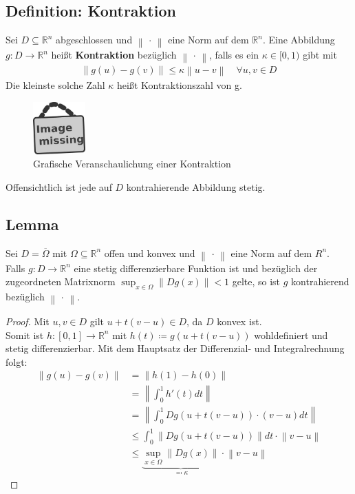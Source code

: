\documentclass[ngerman,fontsize=11pt, paper=a4, parskip=half, titlepage=true, toc=bib]{scrbook}
\newcommand{\R}{\mathds{R}}
\newcommand{\nn}[1]{\left\| #1 \right\|}
\newcommand{\imagemissing}[1]{
	\begin{figure}
		\parbox{\linewidth}{
			\centering
			\includegraphics[width=2cm]{images/image_missing.jpg}
		}
		\caption{#1}
	\end{figure}
}
\begin{document}
	\subsection{Definition: Kontraktion} 
	Sei $D\subseteq  \R^n $ abgeschlossen und $\nn{\,\cdot\,}$ eine Norm auf dem $\R^n$.
	Eine Abbildung $g:D\rightarrow \R^n $ heißt \textbf{Kontraktion} bezüglich  $\nn{\,\cdot\,}$,
	falls es ein $\kappa \in [0,1)$ gibt mit
	\begin{gather*}
		\nn{g(u)-g(v)} \leq \kappa \nn{u-v} \quad \forall u,v\in D
	\end{gather*}
	Die kleinste solche Zahl $\kappa$ heißt Kontraktionszahl von g.
	
	\imagemissing{Grafische Veranschaulichung einer Kontraktion}
	
	Offensichtlich ist jede auf $D$ kontrahierende Abbildung stetig.
	
	\subsection{Lemma} \label{5.2.3}\addtocounter{equation}{1}
	Sei $D=\overline{\Omega} $ mit $\Omega \subseteq \R^n$ offen und konvex
	und $\nn{\,\cdot\,}$ eine Norm auf dem $R^n$.\\
	Falls $g:D\longrightarrow \R^n$ eine stetig differenzierbare Funktion ist und
	bezüglich der zugeordneten Matrixnorm $\sup_{x\in \Omega}\nn{Dg(x)}<1$ gelte,
	so ist $g$ kontrahierend bezüglich  $\nn{\,\cdot\,}$.
	
	\begin{proof}
		Mit $u,v \in D$ gilt $u+t(v-u)\in D$, da $D$ konvex ist. \\
		Somit ist $h:[0,1]\rightarrow \R^n $ mit $h(t) \coloneqq g(u+t(v-u))$ wohldefiniert
		und stetig differenzierbar. Mit dem Hauptsatz der Differenzial- und Integralrechnung
		folgt:
		\begin{align*}
			\nn{g(u)-g(v)} & = \nn{h(1)-h(0)}  \\
										& = \nn{\int_{0}^{1} h'(t) dt} \\
										& = \nn{\int_{0}^{1} Dg(u+t(v-u))\cdot (v-u)dt} \\
										& \leq \int_{0}^{1} \nn{Dg(u+t(v-u))}dt \cdot \nn{v-u} \\
										& \leq \underbrace{\sup_{x\in\Omega}\nn{Dg(x)}}_{\eqqcolon \kappa} 
										    \cdot \nn{v-u}
		\end{align*}
	\end{proof}
	
	
\end{document}
